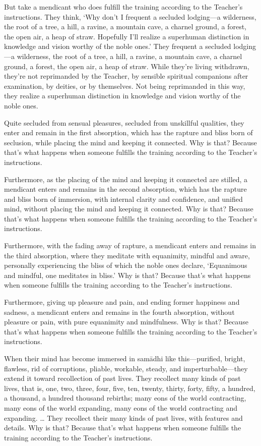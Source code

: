 \documentclass[12pt,openany]{book}%
\begin{document}
But take a mendicant who does fulfill the training according to the Teacher’s instructions. They think, ‘Why don’t I frequent a secluded lodging—a wilderness, the root of a tree, a hill, a ravine, a mountain cave, a charnel ground, a forest, the open air, a heap of straw. Hopefully I’ll realize a superhuman distinction in knowledge and vision worthy of the noble ones.’ They frequent a secluded lodging—a wilderness, the root of a tree, a hill, a ravine, a mountain cave, a charnel ground, a forest, the open air, a heap of straw. While they’re living withdrawn, they’re not reprimanded by the Teacher, by sensible spiritual companions after examination, by deities, or by themselves. Not being reprimanded in this way, they realize a superhuman distinction in knowledge and vision worthy of the noble ones. 

Quite secluded from sensual pleasures, secluded from unskillful qualities, they enter and remain in the first absorption, which has the rapture and bliss born of seclusion, while placing the mind and keeping it connected. Why is that? Because that’s what happens when someone fulfills the training according to the Teacher’s instructions. 

Furthermore, as the placing of the mind and keeping it connected are stilled, a mendicant enters and remains in the second absorption, which has the rapture and bliss born of immersion, with internal clarity and confidence, and unified mind, without placing the mind and keeping it connected. Why is that? Because that’s what happens when someone fulfills the training according to the Teacher’s instructions. 

Furthermore, with the fading away of rapture, a mendicant enters and remains in the third absorption, where they meditate with equanimity, mindful and aware, personally experiencing the bliss of which the noble ones declare, ‘Equanimous and mindful, one meditates in bliss.’ Why is that? Because that’s what happens when someone fulfills the training according to the Teacher’s instructions. 

Furthermore, giving up pleasure and pain, and ending former happiness and sadness, a mendicant enters and remains in the fourth absorption, without pleasure or pain, with pure equanimity and mindfulness. Why is that? Because that’s what happens when someone fulfills the training according to the Teacher’s instructions. 

When their mind has become immersed in \textsanskrit{samādhi} like this—purified, bright, flawless, rid of corruptions, pliable, workable, steady, and imperturbable—they extend it toward recollection of past lives. They recollect many kinds of past lives, that is, one, two, three, four, five, ten, twenty, thirty, forty, fifty, a hundred, a thousand, a hundred thousand rebirths; many eons of the world contracting, many eons of the world expanding, many eons of the world contracting and expanding. … They recollect their many kinds of past lives, with features and details. Why is that? Because that’s what happens when someone fulfills the training according to the Teacher’s instructions. 
\end{document}
